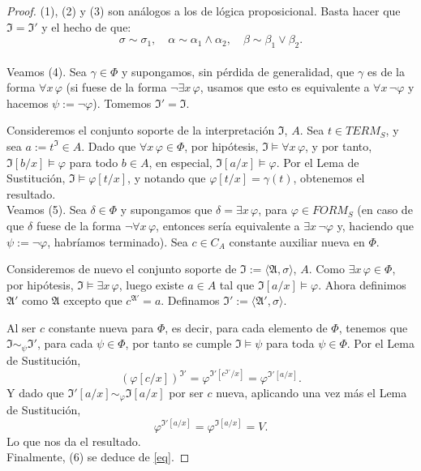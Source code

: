\begin{proof} \mbox{}

(1), (2) y (3) son análogos a los de lógica proposicional. Basta hacer que $\mathfrak{I} = \mathfrak{I}'$ y el hecho de que:$$\sigma \sim \sigma_1, \quad \alpha \sim \alpha_1 \land \alpha_2, \quad \beta \sim \beta_1 \lor \beta_2.$$ \\

Veamos (4). Sea $\gamma \in \Phi$ y supongamos, sin pérdida de generalidad, que $\gamma$ es de la forma $\forall x \, \varphi$ (si fuese de la forma $\neg \exists x \, \varphi$, usamos que esto es equivalente a $\forall x \, \neg \varphi$ y hacemos $\psi := \neg \varphi$). Tomemos $\mathfrak{I}' = \mathfrak{I}$.

\noindent Consideremos el conjunto soporte de la interpretación $\mathfrak{I}$, $A$. Sea $t \in TERM_S$, y sea $a := t^{\mathfrak{I}} \in A$. Dado que $\forall x \, \varphi \in \Phi$, por hipótesis, $\mathfrak{I} \vDash \forall x \, \varphi$, y por tanto, $\mathfrak{I}[b/x] \vDash \varphi$ para todo $b \in A$, en especial, $\mathfrak{I}[a/x] \vDash \varphi$. Por el Lema de Sustitución, $\mathfrak{I} \vDash \varphi[t/x]$, y notando que $\varphi[t/x] = \gamma(t)$, obtenemos el resultado. \\

Veamos (5). Sea $\delta \in \Phi$ y supongamos que $\delta = \exists x \, \varphi$, para $\varphi \in FORM_S$ (en caso de que $\delta$ fuese de la forma $\neg \forall x \, \varphi$, entonces sería equivalente a $\exists x \, \neg \varphi$ y, haciendo que $\psi := \neg \varphi$, habríamos terminado). Sea $c \in C_A$ constante auxiliar nueva en $\Phi$.

\noindent Consideremos de nuevo el conjunto soporte de $\mathfrak{I} := \langle \mathfrak{A}, \sigma \rangle$, $A$. Como $\exists x \, \varphi \in \Phi$, por hipótesis, $\mathfrak{I} \vDash \exists x \, \varphi$, luego existe $a \in A$ tal que $\mathfrak{I}[a/x] \vDash \varphi$. Ahora definimos $\mathfrak{A}'$ como $\mathfrak{A}$ excepto que $c^{\mathfrak{A}'} = a$. Definamos $\mathfrak{I}' := \langle \mathfrak{A}', \sigma \rangle$. 

\noindent Al ser $c$ constante nueva para $\Phi$, es decir, para cada elemento de $\Phi$, tenemos que $\mathfrak{I} \sim_{\psi} \mathfrak{I}'$, para cada $\psi \in \Phi$, por tanto se cumple $\mathfrak{I} \vDash \psi$ para toda $\psi\in\Phi$. Por el Lema de Sustitución, 
$$(\varphi[c/x])^{\mathfrak{I}'} = \varphi^{\mathfrak{I}'[c^{\mathfrak{I}'}/x]} = \varphi^{\mathfrak{I}'[a/x]}.$$
Y dado que $\mathfrak{I}'[a/x] \sim_{\varphi} \mathfrak{I}[a/x]$ por ser $c$ nueva, aplicando una vez más el Lema de Sustitución, 
$$\varphi^{\mathfrak{I}'[a/x]} = \varphi^{\mathfrak{I}[a/x]} = V.$$
Lo que nos da el resultado. \\

Finalmente, (6) se deduce de \ref{eq}. 
\end{proof}
